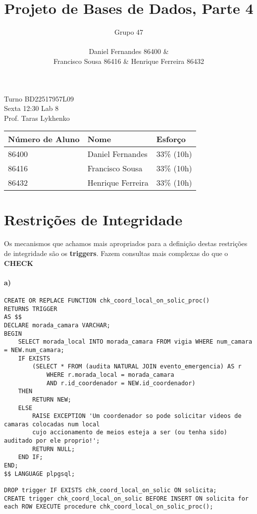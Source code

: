 \documentclass[10pt,a4paper]{article}
\author{Grupo 47 \\\\ Daniel Fernandes 86400 \& \\Francisco Sousa 86416 \& Henrique Ferreira 86432}
\title{Projeto de Bases de Dados, Parte 4}
\begin{document}
\maketitle

\begin{center}
Turno BD22517957L09 \\
Sexta 12:30 Lab 8 \\
Prof. Taras Lykhenko \\
\end{center}

\begin{table}[h]
    \centering
    \begin{tabular}{lll}
    \hline
    \textbf{Número de Aluno} & \textbf{Nome} & \textbf{Esforço} \\ \hline
    86400 & Daniel Fernandes & 33\% (10h) \\ \hline
    86416 & Francisco Sousa & 33\% (10h) \\ \hline
    86432 & Henrique Ferreira & 33\% (10h) \\ \hline
    \end{tabular}
\end{table}
\newpage

\section{Restrições de Integridade}

Os mecanismos que achamos mais apropriados para a definição destas restrições
de integridade são os \textbf{triggers}. Fazem consultas mais complexas do que o \textbf{CHECK}

\paragraph{a)}
\begin{verbatim}
CREATE OR REPLACE FUNCTION chk_coord_local_on_solic_proc() 
RETURNS TRIGGER
AS $$
DECLARE morada_camara VARCHAR;
BEGIN
    SELECT morada_local INTO morada_camara FROM vigia WHERE num_camara = NEW.num_camara;
    IF EXISTS 
        (SELECT * FROM (audita NATURAL JOIN evento_emergencia) AS r
            WHERE r.morada_local = morada_camara
            AND r.id_coordenador = NEW.id_coordenador)
    THEN
        RETURN NEW;
    ELSE
        RAISE EXCEPTION 'Um coordenador so pode solicitar videos de camaras colocadas num local
        cujo accionamento de meios esteja a ser (ou tenha sido) auditado por ele proprio!';
        RETURN NULL;
    END IF;
END;
$$ LANGUAGE plpgsql;

DROP trigger IF EXISTS chk_coord_local_on_solic ON solicita;
CREATE trigger chk_coord_local_on_solic BEFORE INSERT ON solicita for each ROW EXECUTE procedure chk_coord_local_on_solic_proc();
    
\end{verbatim}
\end{document}
